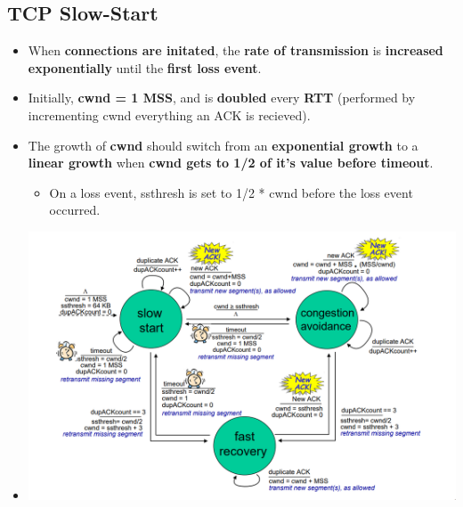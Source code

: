 \documentclass{article}
\begin{document}
    \subsection*{TCP Slow-Start}
    \begin{itemize}
        \item When \textbf{connections are initated}, the \textbf{rate of transmission} is \textbf{increased exponentially} until the \textbf{first loss event}.
        \item Initially, \textbf{cwnd = 1 MSS}, and is \textbf{doubled} every \textbf{RTT} (performed by incrementing cwnd everything an ACK is recieved).
        \item The growth of \textbf{cwnd} should switch from an \textbf{exponential growth} to a \textbf{linear growth} when \textbf{cwnd gets  to 1/2 of it's value before timeout}.
        \begin{itemize}
            \item On a loss event, ssthresh is set to 1/2 * cwnd before the loss event occurred.
        \end{itemize}  
        \item[] \begin{center}
                    \includegraphics*[width=\textwidth - 25pt]{images/TCP-Congestion-Control.PNG}
                \end{center}
    \end{itemize}
\end{document}
